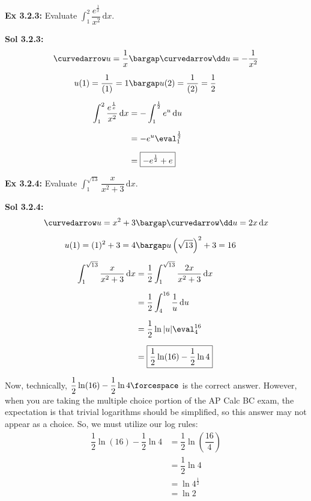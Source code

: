 \begin{tcolorbox}[example]
    \textbf{Ex 3.2.3: } Evaluate $\int_1^2 \dfrac{e^{\frac{1}{x}}}{x^2} \,\mathrm{d}x$.
\end{tcolorbox}
\begin{tcolorbox}[solution]
    \textbf{Sol 3.2.3: } \begin{align*}
        \curvedarrow u = \dfrac{1}{x} &\bargap \curvedarrow \dd u = -\dfrac{1}{x^2} \\[5.5pt]
        u(1) = \dfrac{1}{(1)} = 1 &\bargap u(2) = \dfrac{1}{(2)} = \dfrac{1}{2} \\[5.5pt]
        \int_1^2 \dfrac{e^{\frac{1}{x}}}{x^2} \,\mathrm{d}x & = -\int_1^{\frac{1}{2}} e^u \,\mathrm{d}u \\[5.5pt]
        & = -e^u \eval_1^{\frac{1}{2}} \\[5.5pt]
        & = \boxed{-e^{\frac{1}{2}} + e}
    \end{align*}
\end{tcolorbox} \vspace{11pt}

\begin{tcolorbox}[example]
    \textbf{Ex 3.2.4: } Evaluate $\int_1^{\sqrt{13}} \dfrac{x}{x^2 + 3} \,\mathrm{d}x$.
\end{tcolorbox}
\begin{tcolorbox}[solution]
    \textbf{Sol 3.2.4: } \begin{align*}
        \curvedarrow u = x^2 + 3 &\bargap \curvedarrow \dd u = 2x \,\mathrm{d}x \\[5.5pt]
        u(1) = (1)^2 + 3 = 4 &\bargap u\left(\sqrt{13}\right)^2 + 3 = 16 \\[5.5pt]
        \int_1^{\sqrt{13}} \dfrac{x}{x^2 + 3} \,\mathrm{d}x &= \dfrac{1}{2}\int_1^{\sqrt{13}} \dfrac{2x}{x^2 + 3} \,\mathrm{d}x \\[5.5pt]
        & = \dfrac{1}{2}\int_4^{16} \dfrac{1}{u} \,\mathrm{d}u \\[5.5pt]
        & = \dfrac{1}{2}\ln |u| \eval_4^{16} \\[5.5pt]
        & = \boxed{\dfrac{1}{2}\ln (16) - \dfrac{1}{2} \ln 4}
    \end{align*}
    \begin{tcolorbox}[interesting]
        Now, technically, $\dfrac{1}{2}\ln (16) - \dfrac{1}{2} \ln 4 \forcespace$ is the correct answer. However, when you are taking the multiple choice portion of the AP Calc BC exam, the expectation is that trivial logarithms should be simplified, so this answer may not appear as a choice. So, we must utilize our log rules: \begin{align*}
            \dfrac{1}{2}\ln (16) - \dfrac{1}{2} \ln 4 &= \dfrac{1}{2}\ln \left(\dfrac{16}{4}\right) \\[5.5pt]
            & = \dfrac{1}{2}\ln 4 \\[5.5pt]
            & = \ln 4^{\frac{1}{2}} \\[5.5pt]
            & = \boxed{\ln 2}
        \end{align*}
    \end{tcolorbox}
\end{tcolorbox}


